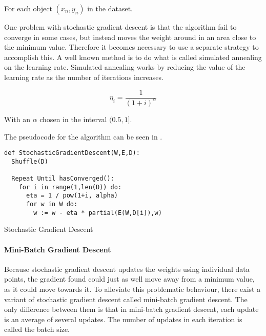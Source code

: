 For each object $(x_n, y_n)$ in the dataset.

One problem with stochastic gradient descent is that the algorithm fail to converge in some cases, but instead moves the weight around in an area close to the minimum value.
Therefore it becomes necessary to use a separate strategy to accomplish this.
A well known method is to do what is called simulated annealing on the learning rate.
Simulated annealing works by reducing the value of the learning rate as the number of iterations increases.

$$\eta_i = \frac{1}{(1+i)^\alpha}$$

With an $\alpha$ chosen in the interval $(0.5,1]$. 


The pseudocode for the algorithm can be seen in .
\begin{listing}[H]
\begin{verbatim}
def StochasticGradientDescent(W,E,D):
  Shuffle(D)

  Repeat Until hasConverged():
    for i in range(1,len(D)) do:
      eta = 1 / pow(1+i, alpha)
      for w in W do: 
        w := w - eta * partial(E(W,D[i]),w)

\end{verbatim}
\caption{Stochastic Gradient Descent}
\label{lst:sgt}
\end{listing}

\paragraph{Mini-Batch Gradient Descent}\label{sec:mini-batch}
Because stochastic gradient descent updates the weights using individual data points, the gradient found could just as well move away from a minimum value, as it could move towards it. 
To alleviate this problematic behaviour, there exist a variant of stochastic gradient descent called mini-batch gradient descent. 
The only difference between them is that in mini-batch gradient descent, each update is an average of several updates.
The number of updates in each iteration is called the batch size.







